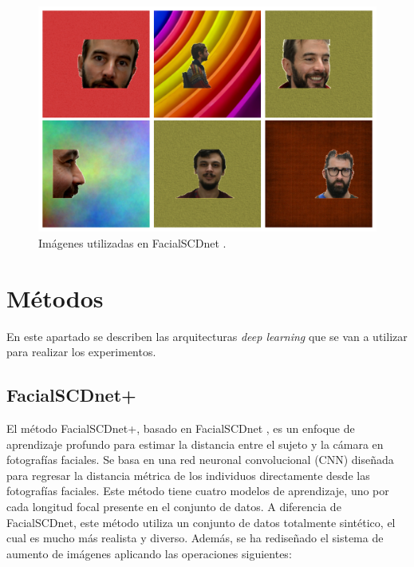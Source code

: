 \begin{figure}[h]
	\centering
	\includegraphics[scale=0.3]{imagenes/cap4/figura_FSCDnet.png}
	\caption[Ejemplos de imágenes utilizadas en FacialSCDnet.]{Imágenes utilizadas en FacialSCDnet \cite{14}.}
	\label{fig24.1}
\end{figure}

\section{Métodos}

En este apartado se describen las arquitecturas \textit{deep learning} que se van a utilizar para realizar los experimentos.

\subsection{FacialSCDnet+}

El método FacialSCDnet+, basado en FacialSCDnet \cite{14}, es un enfoque de aprendizaje profundo para estimar la distancia entre el sujeto y la cámara en fotografías faciales. Se basa en una red neuronal convolucional (CNN) diseñada para regresar la distancia métrica de los individuos directamente desde las fotografías faciales. Este método tiene cuatro modelos de aprendizaje, uno por cada longitud focal presente en el conjunto de datos.
A diferencia de FacialSCDnet, este método utiliza un conjunto de datos totalmente sintético, el cual es mucho más realista y diverso. Además, se ha rediseñado el sistema de aumento de imágenes aplicando las operaciones siguientes:

